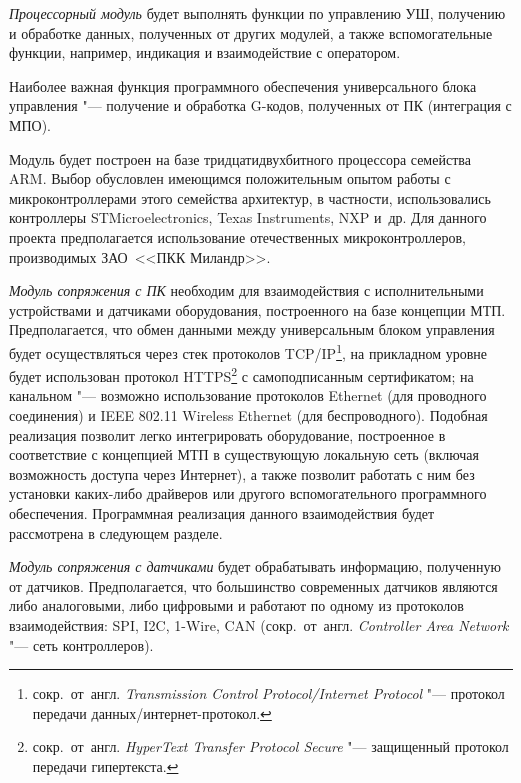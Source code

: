 \textit{Процессорный модуль} будет выполнять функции по управлению УШ, получению и обработке данных, полученных от других модулей, а также вспомогательные функции, например, индикация и взаимодействие с оператором.

Наиболее важная функция программного обеспечения универсального блока управления "--- получение и обработка G-кодов, полученных от ПК (интеграция с \foreignlanguage{english}{МПО}).

Модуль будет построен на базе тридцатидвухбитного процессора семейства \foreignlanguage{english}{ARM}. Выбор обусловлен имеющимся положительным опытом работы с микроконтроллерами этого семейства архитектур, в частности, использовались контроллеры \foreignlanguage{english}{STMicroelectronics}, \foreignlanguage{english}{Texas Instruments}, \foreignlanguage{english}{NXP} и~др. Для данного проекта предполагается использование отечественных микроконтроллеров, производимых ЗАО~<<ПКК Миландр>>.

\textit{Модуль сопряжения с ПК} необходим для взаимодействия с исполнительными устройствами и датчиками оборудования, построенного на базе концепции \foreignlanguage{english}{МТП}. Предполагается, что обмен данными между универсальным блоком управления будет осуществляться через стек протоколов \foreignlanguage{english}{TCP/IP}\footnote{сокр.~от~англ. \textit{Transmission Control Protocol/Internet Protocol} "--- протокол передачи данных/интернет-протокол.}, на прикладном уровне будет использован протокол \foreignlanguage{english}{HTTPS}\footnote{сокр.~от~англ. \textit{HyperText Transfer Protocol Secure} "--- защищенный протокол передачи гипертекста.} с самоподписанным сертификатом; на канальном "--- возможно использование протоколов \foreignlanguage{english}{Ethernet} (для проводного соединения) и IEEE 802.11 Wireless Ethernet (для беспроводного). Подобная реализация позволит легко интегрировать оборудование, построенное в соответствие с концепцией \foreignlanguage{english}{МТП} в существующую локальную сеть (включая возможность доступа через Интернет), а также позволит работать с ним без установки каких-либо драйверов или другого вспомогательного программного обеспечения. Программная реализация данного взаимодействия будет рассмотрена в следующем разделе.

\textit{Модуль сопряжения с датчиками} будет обрабатывать информацию, полученную от датчиков. Предполагается, что большинство современных датчиков являются либо аналоговыми, либо цифровыми и работают по одному из протоколов взаимодействия: \foreignlanguage{english}{SPI}, \foreignlanguage{english}{I}2\foreignlanguage{english}{C}, 1-\foreignlanguage{english}{Wire}, \foreignlanguage{english}{CAN} (сокр.~от~англ. \textit{Controller Area Network} "--- сеть контроллеров).

